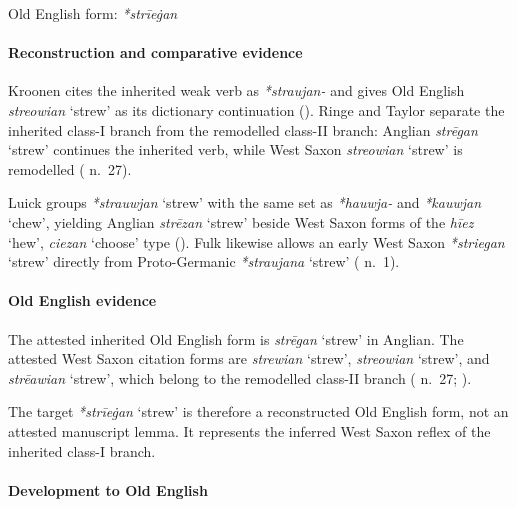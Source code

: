 \documentclass[
  british,
  a4paper,
]{article}
\providecommand{\Recon}[1]{\emph{*#1}}
\begin{document}
Old English form: \emph{*strīeġan}

\paragraph{Reconstruction and comparative
evidence}\label{reconstruction-and-comparative-evidence-150}

Kroonen cites the inherited weak verb as {\emph{*straujan-}} and gives
Old English {\emph{streowian}} `strew' as its dictionary continuation
(). Ringe and Taylor
separate the inherited class-I branch from the remodelled class-II
branch: Anglian {\emph{strēgan}} `strew' continues the inherited verb,
while West Saxon {\emph{streowian}} `strew' is remodelled
(
n.~27).

Luick groups \Recon{strauwjan} `strew' with the same set as
\emph{*hauwja-} and \Recon{kauwjan} `chew', yielding Anglian
{\emph{strēzan}} `strew' beside West Saxon forms of the {\emph{hīez}}
`hew', {\emph{ciezan}} `choose' type (). Fulk likewise allows an early West Saxon
\Recon{striegan} `strew' directly from Proto-Germanic \Recon{straujana}
`strew' ( n.~1).

\paragraph{Old English evidence}\label{old-english-evidence-152}

The attested inherited Old English form is {\emph{strēgan}} `strew' in
Anglian. The attested West Saxon citation forms are {\emph{strewian}}
`strew', {\emph{streowian}} `strew', and {\emph{strēawian}} `strew',
which belong to the remodelled class-II branch
( n.~27;
).

The target \Recon{strīeġan} `strew' is therefore a reconstructed Old
English form, not an attested manuscript lemma. It represents the
inferred West Saxon reflex of the inherited class-I branch.

\paragraph{Development to Old
English}\label{development-to-old-english-151}
\end{document}
